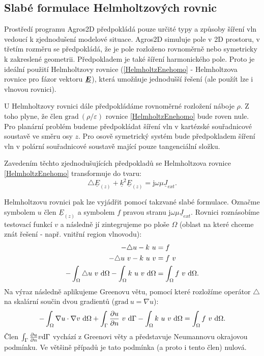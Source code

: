 \documentclass[12pt,a4paper,oneside]{article}
\numberwithin{equation}{section} %
\numberwithin{figure}{section} %
\numberwithin{table}{section} %
\newcommand{\mj}{\mathrm{j}} %
\renewcommand{\vec}[1]{\mbox{\boldmath$#1$}} %
\newcommand{\faz}[1]{{\underline{#1}}} %
\newcommand{\grad}{\mathrm{grad}\ }
\begin{document}
\subsection{Slabé formulace Helmholtzových rovnic}
\label{weakforms}
Prostředí programu Agros2D předpokládá pouze určité typy a způsoby šíření vln vedoucí k zjednodušení modelové situace. Agros2D simuluje pole v 2D prostoru, v třetím rozměru se předpokládá, že je pole rozloženo rovnoměrně nebo symetricky k zakreslené geometrii. Předpokladem je také šíření harmonického pole. Proto je ideální použití Helmholtzovy rovnice (\ref{HelmholtzEnehomo} - Helmholtzova rovnice pro fázor vektoru $\faz{\vec{E}}$), která umožňuje jednodušší řešení (ale použít lze i vlnovou rovnici).

U Helmholtzovy rovnici dále předpokládáme rovnoměrné rozložení náboje $\rho$. Z toho plyne, že člen $\grad \! \! (\rho / \varepsilon)$ rovnice \ref{HelmholtzEnehomo} bude roven nule. Pro planární problém budeme předpokládat šíření vln v kartézské souřadnicové soustavě ve směru osy $z$. Pro osově symetrický systém bude předpokladem šíření vln v polární souřadnicové soustavě mající pouze tangenciální složku.

Zavedením těchto zjednodušujících předpokladů se Helmholtzova rovnice \ref{HelmholtzEnehomo} transformuje do tvaru:
\begin{equation}
\label{HelmEasy}
\triangle \faz{E} _{(z)} + \faz{k} ^2 \faz{E} _{(z)} = \mj \omega \mu \faz{J} _{ext} .
\end{equation}

Helmholtzovu rovnici pak lze vyjádřit pomocí takzvané slabé formulace. Označme symbolem $u$ člen $\faz{E} _{(z)}$ a symbolem $f$ pravou stranu $\mj \omega \mu \faz{J} _{ext}$. Rovnici roznásobíme testovací funkcí $v$ a následně jí zintegrujeme po ploše $\Omega$ (oblast na které chceme znát řešení - např. vnitřní region vlnovodu):
\begin{subequations}
\label{Poisson}
\begin{align}
- \triangle u - k ~ u &= f
\\
- \triangle u ~ v - k ~ u ~ v &= f ~ v
\\
- \int _{\Omega} \triangle u ~ v ~ \mathrm{d} \Omega - \int _{\Omega} k ~ u ~ v ~ \mathrm{d} \Omega &= \int _{\Omega} f ~ v ~ \mathrm{d} \Omega .
\end{align}
\end{subequations}
Na výraz následně aplikujeme Greenovu větu, pomocí které rozložíme operátor $\triangle$ na skalární součin dvou gradientů ($\grad u = \nabla u$):
\begin{equation}
\label{Green}
- \int _{\Omega} \nabla u \cdot \nabla v ~ \mathrm{d} \Omega + \int _{\Gamma} \frac{\partial u}{\partial n} ~ v ~ \mathrm{d} \Gamma - \int _{\Omega} k ~ u ~ v ~ \mathrm{d} \Omega = \int _{\Omega} f ~ v ~ \mathrm{d} \Omega .
\end{equation}
Člen $\int _{\Gamma} \frac{\partial u}{\partial n} v \mathrm{d} \Gamma$ vychází z Greenovi věty a představuje Neumannovu okrajovou podmínku. Ve většině případů je tato podmínka (a proto i tento člen) nulová.
\end{document}
